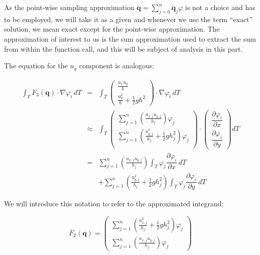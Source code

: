 \documentclass[a4paper, twoside]{article}
\newcommand{\pd}[2]{\dfrac{\partial #1}{\partial #2}}
\renewcommand{\phi}{\varphi}
\begin{document}
As the point-wise sampling approximation $\mathbf{q} = \sum_{j=0}^{n} \mathbf{q}_j \phi$ is not a choice and has to be employed, we will take it as a given and whenever we use the term ``exact'' solution, we mean exact except for the point-wise approximation. The approximation of interest to us is the sum approximation used to extract the sum from within the function call, and this will be subject of analysis in this part.

The equation for the $u_y$ component is analogous:

\begin{eqnarray*}
  \int_T F_3\left(\mathbf{q}\right) \cdot \nabla \phi_i \, dT & = &
  \int_T
  \begin{pmatrix}
    \frac{u_x u_y}{h} \\ \frac{u_y^2}{h} + \frac{1}{2} g h^2
  \end{pmatrix}
  \cdot \nabla \phi_i \, dT \\
  & \approx & \int_T
  \begin{pmatrix}
    \sum_{j=1}^n \left(\frac{u_{x,j} u_{y,j}}{h_j}\right) \phi_j \\
    \sum_{j=1}^n \left(\frac{u_{y,j}^2}{h_j} + \frac{1}{2} g h_j^2\right) \phi_j \\
  \end{pmatrix}
  \cdot
  \begin{pmatrix}
    \pd{\phi_i}{x} \\
    \pd{\phi_i}{y}
  \end{pmatrix} dT \\
  & = & \sum_{j=1}^n \left(\frac{u_{x,j} u_{y,j}}{h_j}\right) \int_T \phi_j \pd{\phi_i}{x} \, dT \\
  & {} & + \sum_{j=1}^n \left(\frac{u_{y,j}^2}{h_j} + \frac{1}{2} g h_j^2\right) \int_T \phi_j \pd{\phi_i}{y} \, dT
\end{eqnarray*}

We will introduce this notation to refer to the approximated integrand:

\begin{equation}
  \label{eq:point-wise-approx-result-second-line}
  \overline{F}_2(\mathbf{q})
  =
  \begin{pmatrix}
    \sum_{j=1}^n \left(\frac{u_{x,j}^2}{h_j} + \frac{1}{2} g h_j^2\right) \phi_j \\
    \sum_{j=1}^n \left(\frac{u_{x,j} u_{y,j}}{h_j}\right) \phi_j
  \end{pmatrix}
\end{equation}
\end{document}
